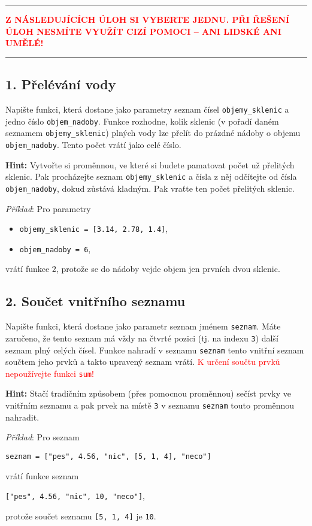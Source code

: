 \documentclass[a4paper,11pt]{article}
\newcommand{\clr}{\textcolor{red}}
\begin{document}
\thispagestyle{empty}

\hrule
\vspace*{-1em}
\begin{center}
 \clr{\textbf{Z NÁSLEDUJÍCÍCH ÚLOH SI VYBERTE JEDNU. PŘI ŘEŠENÍ ÚLOH 
  NESMÍTE VYUŽÍT CIZÍ POMOCI -- ANI LIDSKÉ ANI UMĚLÉ!}}
\end{center}
\hrule

\subsection*{1. Přelévání vody}

Napište funkci, která dostane jako parametry seznam čísel
\texttt{objemy\_sklenic} a jedno číslo \texttt{objem\_nadoby}. Funkce rozhodne,
kolik sklenic (v pořadí daném seznamem \texttt{objemy\_sklenic}) plných vody lze
přelít do prázdné nádoby o objemu \texttt{objem\_nadoby}. Tento počet vrátí jako
celé číslo.

\textbf{Hint:} Vytvořte si proměnnou, ve které si budete pamatovat počet už
přelitých sklenic. Pak procházejte seznam \texttt{objemy\_sklenic} a čísla z něj
odčítejte od čísla \texttt{objem\_nadoby}, dokud zůstává kladným. Pak vraťte ten
počet přelitých sklenic.

\emph{Příklad}: Pro parametry
\begin{itemize}
 \item \texttt{objemy\_sklenic = [3.14, 2.78, 1.4]},
 \item \texttt{objem\_nadoby = 6},
\end{itemize}
vrátí funkce $2$, protože se do nádoby vejde objem jen prvních dvou sklenic.

\clearpage

\subsection*{2. Součet vnitřního seznamu}

Napište funkci, která dostane jako parametr seznam jménem \texttt{seznam}. Máte
zaručeno, že tento seznam má vždy na čtvrté pozici (tj. na indexu \texttt{3})
další seznam plný celých čísel. Funkce nahradí v seznamu \texttt{seznam} tento
vnitřní seznam součtem jeho prvků a takto upravený seznam vrátí. \clr{K určení
součtu prvků nepoužívejte funkci \texttt{sum}!}

\textbf{Hint:} Stačí tradičním způsobem (přes pomocnou proměnnou) sečíst prvky
ve vnitřním seznamu a pak prvek na místě \texttt{3} v seznamu \texttt{seznam}
touto proměnnou nahradit.

\emph{Příklad}: Pro seznam
\begin{center}
 \texttt{seznam = ["pes", 4.56, "nic", [5, 1, 4], "neco"]}
\end{center}
vrátí funkce seznam
\begin{center}
 \texttt{["pes", 4.56, "nic", 10, "neco"]},
\end{center}
protože součet seznamu \texttt{[5, 1, 4]} je \texttt{10}.
\end{document}

